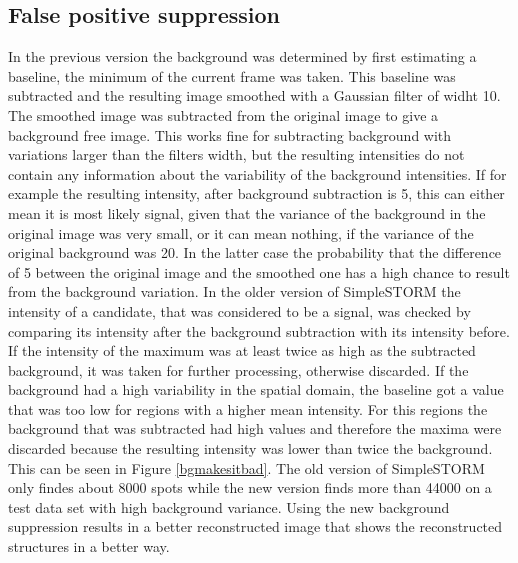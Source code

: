 \subsection{False positive suppression}
In the previous version the background was determined by first estimating a baseline, the minimum of the current frame was taken. This baseline was subtracted and the resulting image smoothed with a Gaussian filter of widht 10. The smoothed image was subtracted from the original image to give a background free image. This works fine for subtracting background with variations larger than the filters width, but the resulting intensities do not contain any information about the variability of the background intensities.\newline
If for example the resulting intensity, after background subtraction is 5, this can either mean it is most likely signal, given that the variance of the background in the original image was very small, or it can mean nothing, if the variance of the original background was 20. In the latter case the probability that the difference of 5 between the original image and the smoothed one has a high chance to result from the background variation.\newline
In the older version of SimpleSTORM the intensity of a candidate, that was considered to be a signal, was checked by comparing its intensity after the background subtraction with its intensity before. If the intensity of the maximum was at least twice as high as the subtracted background, it was taken for further processing, otherwise discarded. If the background had a high variability in the spatial domain, the baseline got a value that was too low for regions with a higher mean intensity. For this regions the background that was subtracted had high values and therefore the maxima were discarded because the resulting intensity was lower than twice the background. This can be seen in Figure \ref{bgmakesitbad}. The old version of SimpleSTORM only findes about 8000 spots while the new version finds more than 44000 on a test data set with high background variance. Using the new background suppression results in a better reconstructed image that shows the reconstructed structures in a better way.

